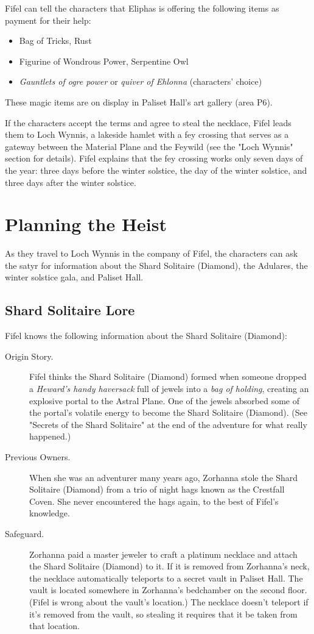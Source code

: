 \documentclass[10pt,a4paper,twoside,bg=print,twocolumn,openany,nodeprecatedcode]{dndbook}
\begin{document}
Fifel can tell the characters that Eliphas is offering the following items as payment for their help:


\begin{itemize}
\item Bag of Tricks, Rust
\item Figurine of Wondrous Power, Serpentine Owl
\item \textit{Gauntlets of ogre power} or \textit{quiver of Ehlonna} (characters' choice)
\end{itemize}

These magic items are on display in Paliset Hall's art gallery (area P6).

If the characters accept the terms and agree to steal the necklace, Fifel leads them to Loch Wynnis, a lakeside hamlet with a fey crossing that serves as a gateway between the Material Plane and the Feywild (see the "Loch Wynnis" section for details). Fifel explains that the fey crossing works only seven days of the year: three days before the winter solstice, the day of the winter solstice, and three days after the winter solstice.

\section{Planning the Heist}
As they travel to Loch Wynnis in the company of Fifel, the characters can ask the satyr for information about the Shard Solitaire (Diamond), the Adulares, the winter solstice gala, and Paliset Hall.

\subsection{Shard Solitaire Lore}
Fifel knows the following information about the Shard Solitaire (Diamond):


\begin{description}
\item[Origin Story.]
Fifel thinks the Shard Solitaire (Diamond) formed when someone dropped a \textit{Heward's handy haversack} full of jewels into a \textit{bag of holding}, creating an explosive portal to the Astral Plane. One of the jewels absorbed some of the portal's volatile energy to become the Shard Solitaire (Diamond). (See "Secrets of the Shard Solitaire" at the end of the adventure for what really happened.)
\item[Previous Owners.]
When she was an adventurer many years ago, Zorhanna stole the Shard Solitaire (Diamond) from a trio of night hags known as the Crestfall Coven. She never encountered the hags again, to the best of Fifel's knowledge.
\item[Safeguard.]
Zorhanna paid a master jeweler to craft a platinum necklace and attach the Shard Solitaire (Diamond) to it. If it is removed from Zorhanna's neck, the necklace automatically teleports to a secret vault in Paliset Hall. The vault is located somewhere in Zorhanna's bedchamber on the second floor. (Fifel is wrong about the vault's location.) The necklace doesn't teleport if it's removed from the vault, so stealing it requires that it be taken from that location.
\end{description}
\end{document}
